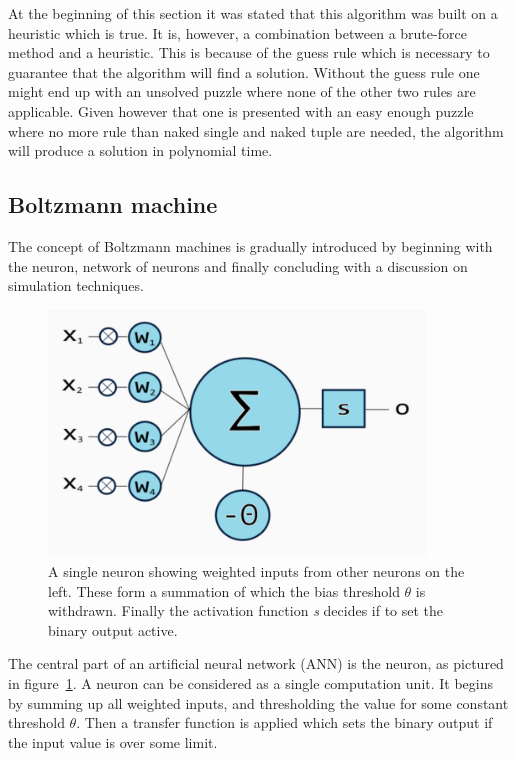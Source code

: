 \documentclass[a4paper,11pt]{kth-mag}
\begin{document}
At the beginning of this section it was stated that this algorithm was built on a heuristic which is true.
It is, however, a combination between a brute-force method and a heuristic.
This is because of the guess rule which is necessary to guarantee that the algorithm will find a solution.
Without the guess rule one might end up with an unsolved puzzle where none of the other two rules are applicable.
Given however that one is presented with an easy enough puzzle where no more rule than naked single and naked tuple are needed, the algorithm will produce a solution in polynomial time.

\FloatBarrier
\subsection{Boltzmann machine}
\label{sec:boltzmannBackground}
The concept of Boltzmann machines is gradually introduced by beginning with the neuron, 
network of neurons and finally concluding with a discussion on simulation techniques.\\

\begin{figure}[here] 
\centering
\includegraphics[width=10cm]{images/neuron.png}
\caption[A single neuron]{A single neuron showing weighted inputs from other neurons on the left. These form a summation of which the bias threshold $\theta$ is withdrawn. Finally the activation function \emph{s} decides if to set the binary output active.}
\label{fig:neural-Neuron}
\end{figure}
The central part of an artificial neural network (ANN) is the neuron, as pictured in figure~\ref{fig:neural-Neuron}.
A neuron can be considered as a single computation unit.
It begins by summing up all weighted inputs, and thresholding the value for some constant threshold $\theta$.
Then a transfer function is applied which sets the binary output if the input value is over some limit.
\end{document}
